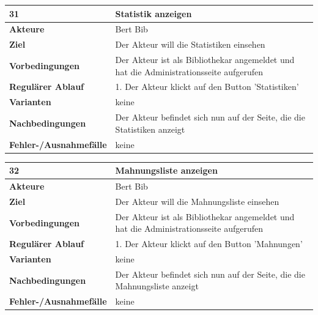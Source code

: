 \documentclass[fontsize=12pt,paper=a4,twoside]{scrartcl}
\begin{document}
\begin{table}[htbp]
\label{31}
\begin{tabular}{|l|p{10cm}|}
\hline 
\textbf{31} & \textbf{Statistik anzeigen} \\ \hline
\textbf{Akteure} & Bert Bib\\ \hline
\textbf{Ziel} & Der Akteur will die Statistiken einsehen \\ \hline
\textbf{Vorbedingungen} & Der Akteur ist als Bibliothekar angemeldet und hat die Administrationsseite 
aufgerufen \\ \hline
\textbf{Regulärer Ablauf} & 
1. Der Akteur klickt auf den Button 'Statistiken' \\
\hline
\textbf{Varianten} & 
keine \\ \hline
\textbf{Nachbedingungen} & Der Akteur befindet sich nun auf der Seite, die die Statistiken anzeigt\\
\hline
\textbf{Fehler-/Ausnahmefälle} & keine\\
\hline
\end{tabular}
\end{table}


\begin{table}[htbp]
\label{32}
\begin{tabular}{|l|p{10cm}|}
\hline 
\textbf{32} & \textbf{Mahnungsliste anzeigen} \\ \hline
\textbf{Akteure} & Bert Bib\\ \hline
\textbf{Ziel} & Der Akteur will die Mahnungsliste einsehen \\ \hline
\textbf{Vorbedingungen} & Der Akteur ist als Bibliothekar angemeldet und hat die Administrationsseite 
aufgerufen \\ \hline
\textbf{Regulärer Ablauf} & 
1. Der Akteur klickt auf den Button 'Mahnungen' \\
\hline
\textbf{Varianten} & 
keine \\ \hline
\textbf{Nachbedingungen} & Der Akteur befindet sich nun auf der Seite, die die Mahnungsliste 
anzeigt\\ \hline
\textbf{Fehler-/Ausnahmefälle} & keine\\
\hline
\end{tabular}
\end{table}
\end{document}

